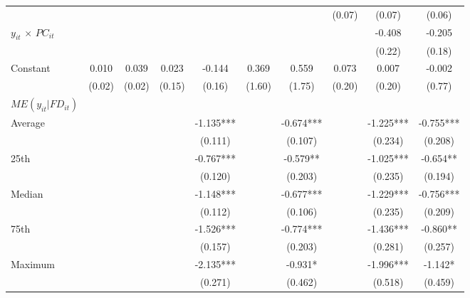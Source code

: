\documentclass[12pt, a4paper]{article}
\begin{document}
\begin{table}
\begin{threeparttable}
{\begin{tabular}{l*{9}{c}}
				&                     &                     &                     &                     &                     &                     &      (0.07)         &      (0.07)         &      (0.06)         \\
				$y_{it}$ $\times$ $PC_{it}$ &                     &                     &                     &                     &                     &                     &                     &      -0.408         &      -0.205         \\
				&                     &                     &                     &                     &                     &                     &                     &      (0.22)         &      (0.18)         \\
				Constant            &       0.010         &       0.039         &       0.023         &      -0.144         &       0.369         &       0.559         &       0.073         &       0.007         &      -0.002         \\
				&      (0.02)         &      (0.02)         &      (0.15)         &      (0.16)         &      (1.60)         &      (1.75)         &      (0.20)         &      (0.20)         &      (0.77)         \\
				\hline
				$ME(y_{it}|FD_{it})$ \\
				Average&&&&	-1.135***	&&	-0.674***	&&	-1.225***	&	-0.755***\\
				&&&&(0.111)   	&&	(0.107)   	&&	(0.234)   	&	(0.208)   \\
				
				25th&&&&	-0.767***	&&	-0.579** 	&&	-1.025***	&	-0.654** \\
				&&&&(0.120)   	&&	(0.203)   	&&	(0.235)   &		(0.194)   \\
				
				Median&&&&	-1.148***	&&	-0.677***&&		-1.229***&	-0.756***\\
				&&&&(0.112)   	&&	(0.106)   &&		(0.235)   &		(0.209)   \\
				
				75th&&&&	-1.526***	&&	-0.774***	&&	-1.436***	&	-0.860**\\ 
				&&&&(0.157)   &&		(0.203)   &&		(0.281)   	&	(0.257)  \\ 
				
				Maximum	&&&&-2.135***	&&	-0.931*  	&&	-1.996***	&	-1.142*  \\
				&&&&(0.271)   &&		(0.462)   &&		(0.518)   	&	(0.459)  \\ 
				

\end{tabular}}
\end{threeparttable}
\end{table}
\end{document}
